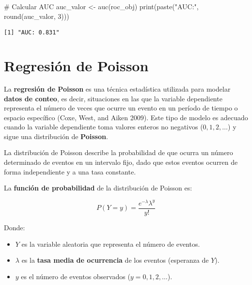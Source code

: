 \documentclass[
  letterpaper,
  DIV=11,
  numbers=noendperiod]{scrreprt}
\newenvironment{Shaded}{\begin{snugshade}}{\end{snugshade}}
\newcommand{\CommentTok}[1]{\textcolor[rgb]{0.37,0.37,0.37}{#1}}
\newcommand{\DecValTok}[1]{\textcolor[rgb]{0.68,0.00,0.00}{#1}}
\newcommand{\FunctionTok}[1]{\textcolor[rgb]{0.28,0.35,0.67}{#1}}
\newcommand{\NormalTok}[1]{\textcolor[rgb]{0.00,0.23,0.31}{#1}}
\newcommand{\OtherTok}[1]{\textcolor[rgb]{0.00,0.23,0.31}{#1}}
\newcommand{\StringTok}[1]{\textcolor[rgb]{0.13,0.47,0.30}{#1}}
\providecommand{\tightlist}{%
  \setlength{\itemsep}{0pt}\setlength{\parskip}{0pt}}
\begin{document}
\begin{tcolorbox}
\begin{Shaded}
\begin{Highlighting}[]
\CommentTok{\# Calcular AUC}
\NormalTok{auc\_valor }\OtherTok{\textless{}{-}} \FunctionTok{auc}\NormalTok{(roc\_obj)}
\FunctionTok{print}\NormalTok{(}\FunctionTok{paste}\NormalTok{(}\StringTok{"AUC:"}\NormalTok{, }\FunctionTok{round}\NormalTok{(auc\_valor, }\DecValTok{3}\NormalTok{)))}
\end{Highlighting}
\end{Shaded}

\begin{verbatim}
[1] "AUC: 0.831"
\end{verbatim}

\end{tcolorbox}

\section{Regresión de Poisson}\label{regresiuxf3n-de-poisson}

La \textbf{regresión de Poisson} es una técnica estadística utilizada
para modelar \textbf{datos de conteo}, es decir, situaciones en las que
la variable dependiente representa el número de veces que ocurre un
evento en un período de tiempo o espacio específico (Coxe, West, and
Aiken 2009). Este tipo de modelo es adecuado cuando la variable
dependiente toma valores enteros no negativos (\(0, 1, 2, \dots\)) y
sigue una distribución de \textbf{Poisson}.

La distribución de Poisson describe la probabilidad de que ocurra un
número determinado de eventos en un intervalo fijo, dado que estos
eventos ocurren de forma independiente y a una tasa constante.

La \textbf{función de probabilidad} de la distribución de Poisson es:

\[
P(Y = y) = \frac{e^{-\lambda} \lambda^y}{y!}
\]

Donde:

\begin{itemize}
\tightlist
\item
  \(Y\) es la variable aleatoria que representa el número de eventos.
\item
  \(\lambda\) es la \textbf{tasa media de ocurrencia} de los eventos
  (esperanza de \(Y\)).
\item
  \(y\) es el número de eventos observados (\(y = 0, 1, 2, \dots\)).
\end{itemize}
\end{document}
